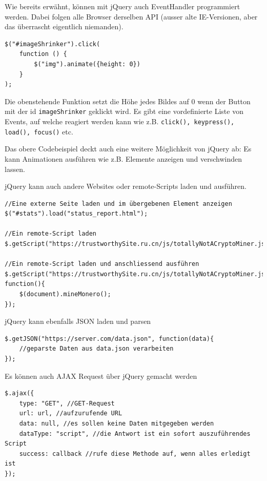 \documentclass[a4paper, 11pt]{article}
\newcommand{\code}[1]{\texttt{#1}}
\begin{document}
\noindent Wie bereits erwähnt, können mit jQuery auch EventHandler programmiert werden. Dabei folgen alle Browser derselben API (ausser alte IE-Versionen, aber das überrascht eigentlich niemanden).
\begin{lstlisting}
$("#imageShrinker").click(
	function () {
		$("img").animate({height: 0})
	}
);
\end{lstlisting}
\noindent Die obenstehende Funktion setzt die Höhe jedes Bildes auf 0 wenn der Button mit der id \code{imageShrinker} geklickt wird. Es gibt eine vordefinierte Liste von Events, auf welche reagiert werden kann wie z.B. \code{click(), keypress(), load(), focus()} etc.

\vspace{10px}

\noindent Das obere Codebeispiel deckt auch eine weitere Möglichkeit von jQuery ab: Es kann Animationen ausführen wie z.B. Elemente anzeigen und verschwinden lassen.

\vspace{10px}

\noindent jQuery kann auch andere Websites oder remote-Scripts laden und ausführen.
\begin{lstlisting}
//Eine externe Seite laden und im übergebenen Element anzeigen
$("#stats").load("status_report.html");

//Ein remote-Script laden
$.getScript("https://trustworthySite.ru.cn/js/totallyNotACryptoMiner.js");

//Ein remote-Script laden und anschliessend ausführen
$.getScript("https://trustworthySite.ru.cn/js/totallyNotACryptoMiner.js", function(){
	$(document).mineMonero();
});
\end{lstlisting}

\vspace{10px}

\noindent jQuery kann ebenfalls JSON laden und parsen
\begin{lstlisting}
$.getJSON("https://server.com/data.json", function(data){
	//geparste Daten aus data.json verarbeiten
});
\end{lstlisting}

\vspace{10px}

\noindent Es können auch AJAX Request über jQuery gemacht werden
\begin{lstlisting}
$.ajax({
	type: "GET", //GET-Request
	url: url, //aufzurufende URL
	data: null, //es sollen keine Daten mitgegeben werden
	dataType: "script", //die Antwort ist ein sofort auszuführendes Script
	success: callback //rufe diese Methode auf, wenn alles erledigt ist
});
\end{lstlisting}
\end{document}
